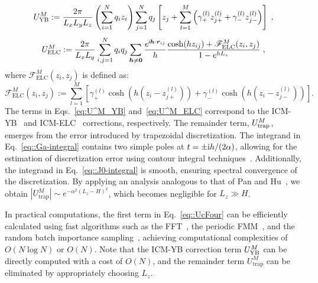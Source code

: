 \begin{equation}\label{eq:U^M_YB}
U_{\text{YB}}^{M}:=\frac{2\pi}{L_xL_yL_z}\left(\sum_{i=1}^{N}q_{i}z_{i}\right)\sum_{j=1}^{N}q_j\left[z_{j}+\sum_{l=1}^{M}\left(\gamma_{+}^{(l)}z_{j+}^{(l)}+\gamma_{-}^{(l)}z_{j-}^{(l)}\right)\right]\;,
\end{equation}
\begin{equation}\label{eq:U^M_ELC}
U_{\text{ELC}}^{M}:=\frac{2\pi}{L_xL_y}\sum_{i,j=1}^{N}q_iq_j\sum_{\bm{h}\neq \bm{0}} \frac{e^{\mathsf i \bm{h}\cdot\bm{r}_{ij}}}{h}\frac{\cosh(hz_{ij})+\mathscr{F}_{\text{ELC}}^M(z_i,z_j)}{1-e^{hL_z}}\;,
\end{equation}
where $\mathscr{F}_{\text{ELC}}^M(z_i,z_j)$ is defined as:
\begin{equation}\label{eq::23}
\mathscr{F}_{\text{ELC}}^M(z_i,z_j):=\sum\limits_{l=1}^{M}\left[\gamma_{+}^{(l)}\cosh(h(z_i-z_{j+}^{(l)}))+\gamma_{-}^{(l)}\cosh(h(z_i-z_{j-}^{(l)}))\right].
\end{equation}
The terms in Eqs.~\eqref{eq:U^M_YB} and~\eqref{eq:U^M_ELC} correspond to the ICM-YB~\cite{yuan2021particle} and ICM-ELC~\cite{tyagi2008electrostatic} corrections, respectively. 
The remainder term, $U^{M}_{\text{trap}}$, emerges from the error introduced by trapezoidal discretization. 
The integrand in Eq.~\eqref{eq::Ga-integral} contains two simple poles at $t=\pm {\text{i}}h/(2\alpha)$, allowing for the estimation of discretization error using contour integral techniques~\cite{trefethen2014Rev}. 
Additionally, the integrand in Eq.~\eqref{eq::J0-integral} is smooth, %
ensuring spectral convergence of the discretization. 
By applying an analysis analogous to that of Pan and Hu~\cite{pan2014rigorous}, we obtain $|U_{\text{trap}}^{M}|\sim e^{-\alpha^2(L_z-H)^2}$, which becomes negligible for $L_z \gg H$.  

In practical computations, the first term in Eq.~\eqref{eq::UcFour} can be efficiently calculated using fast algorithms such as the FFT~\cite{yuan2021particle}, the periodic FMM~\cite{pei2023fast}, and the random batch importance sampling~\cite{liang2022improved}, achieving computational complexities of $O(N\log N)$ or $O(N)$. 
Note that the ICM-YB correction term $U_{\text{YB}}^{M}$ can be directly computed with a cost of $O(N)$, and the remainder term $U_{\text{trap}}^M$ can be eliminated by appropriately choosing $L_z$.

